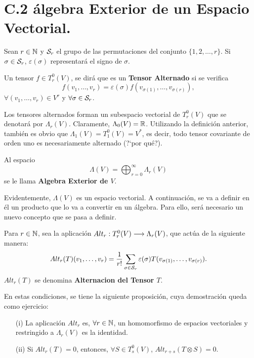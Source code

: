\documentclass[cursovd_portada.tex]{subfiles}
\begin{document}
\section*{C.2 álgebra Exterior de un Espacio Vectorial.}
 \hs Sean $r\in\mathbb{N}$ y
${\cal S}_r$ el grupo de las permutaciones del conjunto $\{1,2,\dots ,r\}$. Si $\sigma\in{\cal S}_r$,
$\varepsilon(\sigma)$ representará el signo de $\sigma$.
\begin{defiap}
Un tensor $f\in T^0_r(V)$, se dirá que es un {\bf Tensor Alternado} si se verifica
$$f(v_1,\dots ,v_r)=\varepsilon(\sigma)f(v_{\sigma (1)},\dots ,v_{\sigma (r)}),$$
$\forall (v_1,\dots ,v_r)\in V^r$ y $\forall\sigma\in{\cal S}_r$.
\end{defiap}
\par\bigskip
Los tensores alternados forman un subespacio vectorial de $T^0_r(V)$ que se denotará por $\Lambda_r(V)$.
Claramente, $\Lambda _0(V)=\mathbb{R}$. Utilizando la definición anterior, también es obvio que $\Lambda
_1(V)=T^0_1(V)=V^*$, es decir, todo tensor covariante de orden uno es necesariamente alternado (?`por qué?).
\begin{defiap}
Al espacio
$$\Lambda (V)=\bigoplus_{r=0}^\infty\Lambda_r(V)$$
se le llama {\bf Algebra Exterior de $V$}.
\end{defiap}
\par\bigskip
Evidentemente, $\Lambda (V)$ es un espacio vectorial. A continuación, se va a definir en él un producto que lo va
a convertir en un álgebra. Para ello, será necesario un nuevo concepto que se pasa a definir.
\begin{defiap}
Para $r\in\mathbb{N}$, sea la aplicación $Alt_r:T^0_r(V)\longrightarrow\Lambda _r(V)$, que actúa de la siguiente manera:
$$Alt_r(T)(v_1,\dots ,v_r)=\frac{1}{r!}\sum_{\sigma\in{\cal S}_r}\varepsilon(
\sigma)T(v_{\sigma(1)},\dots ,v_{\sigma(r)}).$$ \hs $Alt_r(T)$ se denomina {\bf Alternacion del Tensor $T$}.
\end{defiap}
\par\bigskip
En estas condiciones, se tiene la siguiente proposición, cuya demostración queda como ejercicio:
\begin{propoap}
\begin{enumerate}
\item[(i)] La aplicación $Alt_r$ es, $\forall r\in\mathbb{N}$, un homomorfismo de
espacios vectoriales y restringido a $\Lambda_r(V)$ es la identidad.
\item[(ii)] Si $Alt_r(T)=0$, entonces, $\forall S\in T^0_s(V)$, $Alt_{r+s}(T
\otimes S)=0$.
\end{enumerate}
\end{propoap}
\end{document}
